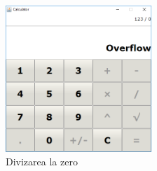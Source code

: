 \begin{figure}[ht]
	\centering
	\includegraphics[width=5.5cm]{calcZero}
	\caption{Divizarea la zero}
\end{figure}

\clearpage